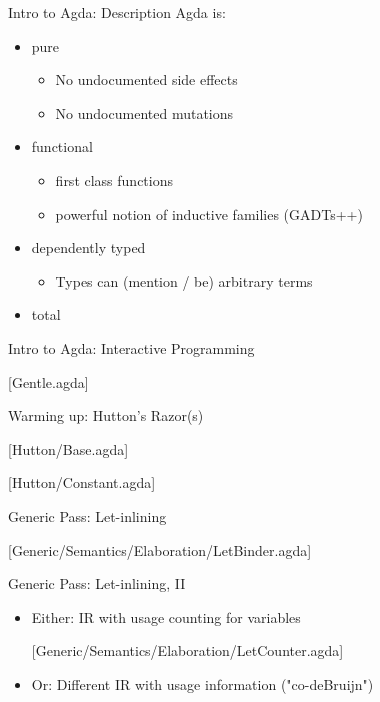 \documentclass{beamer}
\newcommand{\codehere}[1]{
\begin{center}
{\large[#1.agda]}
\end{center}
}
\begin{document}
\begin{frame}{Intro to Agda: Description}
Agda is:
\begin{itemize}
  \item pure
    \begin{itemize}
      \item No undocumented side effects
      \item No undocumented mutations
    \end{itemize}
  \item functional
    \begin{itemize}
      \item first class functions
      \item powerful notion of inductive families (GADTs++)
    \end{itemize}
  \item dependently typed
    \begin{itemize}
      \item Types can (mention / be) arbitrary terms
    \end{itemize}
  \item<1> total
\end{itemize}

\end{frame}

\begin{frame}{Intro to Agda: Interactive Programming}
\codehere{Gentle}
\end{frame}

\begin{frame}{Warming up: Hutton's Razor(s)}
  \codehere{Hutton/Base}
  \codehere{Hutton/Constant}
\end{frame}

\begin{frame}{Generic Pass: Let-inlining}
\codehere{Generic/Semantics/Elaboration/LetBinder}
\end{frame}

\begin{frame}{Generic Pass: Let-inlining, II}
\begin{itemize}
  \item Either: IR with usage counting for variables
    \codehere{Generic/Semantics/Elaboration/LetCounter}

  \item Or: Different IR with usage information ("co-deBruijn")
\end{itemize}
\end{frame}
\end{document}
